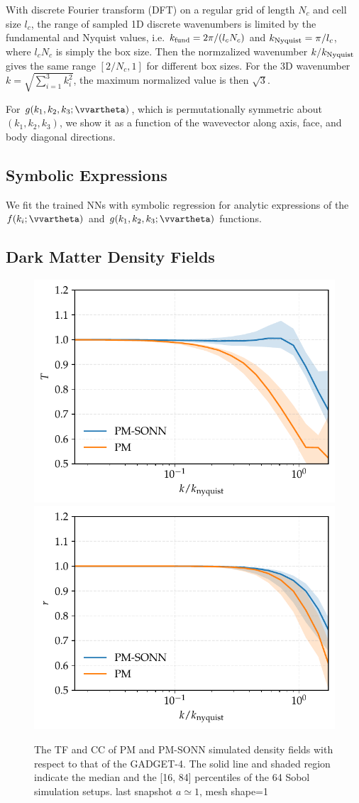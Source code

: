 \documentclass[modern, trackchanges, dvipsnames]{aastex631}
\newcommand{\GADGET}{{{\fontsize{10pt}{12pt}\selectfont GADGET}-4}}
\begin{document}
With discrete Fourier transform (DFT) on a regular grid of length $N_c$
and cell size $l_c$, the range of sampled 1D discrete wavenumbers is
limited by the fundamental and Nyquist values, i.e. $k_{\rm fund} =
2\pi/(l_c N_c)$ and $k_{\rm Nyquist} = \pi/l_c$, where $l_c N_c$ is
simply the box size.
Then the normzalized wavenumber $k/k_{\rm Nyquist}$ gives the same range
$[2/N_c, 1]$ for different box sizes.
For the 3D wavenumber $k=\sqrt{\sum_{i=1}^{3}k_i^2}$, the maximum
normalized value is then $\sqrt{3}$.

For $g(k_1,k_2,k_3;\vvartheta)$, which is permutationally symmetric
about $(k_1, k_2, k_3)$, we show it as a function of the wavevector
along axis, face, and body diagonal directions.


\subsection{Symbolic Expressions}

We fit the trained NNs with symbolic regression for analytic
expressions of the $f(k_i; \vvartheta)$ and $g(k_1, k_2, k_3;
\vvartheta)$ functions.




\subsection{Dark Matter Density Fields}

\begin{figure}
  \centering
  \includegraphics[width=.48\columnwidth]{tf_snap120_3091776_e3000.pdf}
  \includegraphics[width=.48\columnwidth]{cc_snap120_3091776_e3000.pdf}
  \caption{The TF and CC of PM and PM-SONN simulated density fields with
  respect to that of the \GADGET. The solid line and shaded region
  indicate the median and the [16, 84] percentiles of the 64 Sobol
  simulation setups. last snapshot $a\simeq 1$, mesh shape=1}
  \label{fig:tfcc}
\end{figure}
\end{document}

